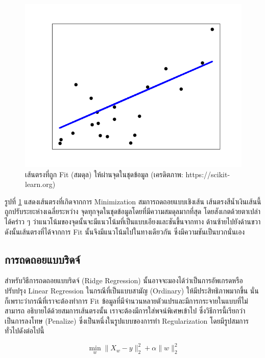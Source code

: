 \begin{figure}[H]
    \centering
    \includegraphics[width=0.8\linewidth]{fig/plot_linear_regression.png}
    \caption{เส้นตรงที่ถูก Fit (สมดุล) ให้ผ่านจุดในชุดข้อมูล (เครดิตภาพ: https://scikit-learn.org)}
    \label{fig:lin_res}
\end{figure}

รูปที่ \ref{fig:lin_res} แสดงเส้นตรงที่เกิดจากการ Minimization สมการถดถอยแบบเชิงเส้น เส้นตรงสีน้ำเงินเส้นนี้ถูกปรับระยะห่างเฉลี่ยระหว่าง%
จุดทุกจุดในชุดข้อมูลโดยที่มีความสมดุลมากที่สุด โดยสังเกตด้วยตาเปล่าได้คร่าว ๆ ว่าแนวโน้มของจุดนั้นจะมีแนวโน้มที่เป็นแบบเอียงและชันขึ้นจากทาง%
ด้านซ้ายไปยังด้านขวา ดังนั้นเส้นตรงที่ได้จากการ Fit นั้นจึงมีแนวโน้มไปในทางเดียวกัน ซึ่งมีความชันเป็นบวกนั่นเอง

\subsection{การถดถอยแบบริดจ์}

สำหรับวิธีการถดถอยแบบริดจ์ (Ridge Regression) นั้นอาจจะมองได้ว่าเป็นการอัพเกรดหรือปรับปรุง Linear Regression ในกรณีที่เป็นแบบสามัญ
(Ordinary) ให้มีประสิทธิภาพมากขึ้น นั่นก็เพราะว่ากรณีที่เราจะต้องทำการ Fit ข้อมูลที่มีจำนวนหลายตัวแปรและมีการกระจายในแบบที่ไม่สามารถ%
อธิบายได้ด้วยสมการเส้นตรงนั้น เราจะต้องมีการใส่พจน์พิเศษเข้าไป ซึ่งวิธีการนี้เรียกว่าเป็นการลงโทษ (Penalize) ซึ่งเป็นหนึ่งในรูปแบบของการทำ
Regularization โดยมีรูปสมการทั่วไปดังต่อไปนี้

\begin{equation}
    \min_{w} \lVert X_{w} - y \rVert_{2}^{2} + \alpha \lVert w \rVert_{2}^{2}
\end{equation}

